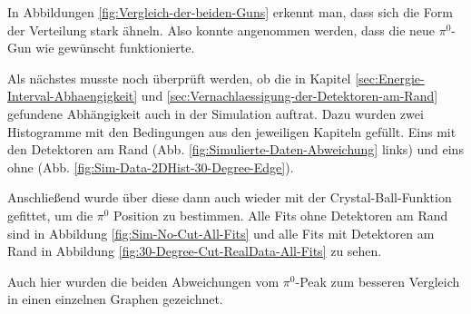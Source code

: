 \documentclass[a4paper,11pt,oneside,final,german,openbib,pdftex]{scrbook}
\begin{document}
{In Abbildungen \ref{fig:Vergleich-der-beiden-Guns} erkennt man, dass sich die Form der Verteilung stark ähneln. Also konnte angenommen werden, dass die neue $\pi^0$-Gun wie gewünscht funktionierte.







Als nächstes musste noch \"uberpr\"uft werden, ob die in Kapitel \ref{sec:Energie-Interval-Abhaengigkeit} und \ref{sec:Vernachlaessigung-der-Detektoren-am-Rand} gefundene Abh\"angigkeit auch in der Simulation auftrat. 
Dazu wurden zwei Histogramme mit den Bedingungen aus den jeweiligen Kapiteln gef\"ullt. Eins mit den Detektoren am Rand (Abb. \ref{fig:Simulierte-Daten-Abweichung} links) und eins ohne (Abb. \ref{fig:Sim-Data-2DHist-30-Degree-Edge}).

Anschlie{\ss}end wurde \"uber diese dann auch wieder mit der Crystal-Ball-Funktion gefittet, um die $\pi^0$ Position zu bestimmen. Alle Fits ohne Detektoren am Rand sind in Abbildung \ref{fig:Sim-No-Cut-All-Fits} und alle Fits mit Detektoren am Rand in Abbildung \ref{fig:30-Degree-Cut-RealData-All-Fits} zu sehen.

Auch hier wurden die beiden Abweichungen vom $\pi^0$-Peak zum besseren Vergleich in einen einzelnen Graphen gezeichnet.

}
\end{document}

